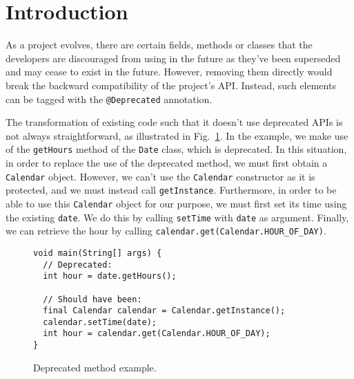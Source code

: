 \documentclass[10pt,conference]{IEEEtran}
\begin{document}




\section{Introduction}\label{sec:intro}

As a project evolves, there are certain fields, methods or classes
that the developers are discouraged from using in the future as
they've been superseded and may cease to exist in the future.
However, removing them directly would break the backward compatibility
of the project's API.  Instead, such elements can be tagged with the
\texttt{@Deprecated} annotation.  %


The transformation of existing code such that it doesn't use
deprecated APIs is not always straightforward, as illustrated in
Fig.~\ref{ex:deprecated-method-other}. In the example, we make use of
the \texttt{getHours} method of the \texttt{Date} class, which is
deprecated.  In this situation, in order to replace the use of the
deprecated method, we must first obtain a \texttt{Calendar} object.
However, we can't use the \texttt{Calendar} constructor as it is
protected, and we must instead call \texttt{getInstance}.
Furthermore, in order to be able to use this \texttt{Calendar} object
for our purpose, we must first set its time using the existing
\texttt{date}.  We do this by calling \texttt{setTime} with
\texttt{date} as argument.  Finally, we can retrieve the hour by
calling \texttt{calendar.get(Calendar.HOUR\_OF\_DAY)}.

\begin{figure}[H]
\begin{lstlisting}[mathescape=true,showstringspaces=false]
void main(String[] args) {
  // Deprecated:
  int hour = date.getHours();
  
  // Should have been:
  final Calendar calendar = Calendar.getInstance();
  calendar.setTime(date);
  int hour = calendar.get(Calendar.HOUR_OF_DAY);
}
\end{lstlisting}
\caption{Deprecated method example.}
\label{ex:deprecated-method-other}
\end{figure}
\end{document}
